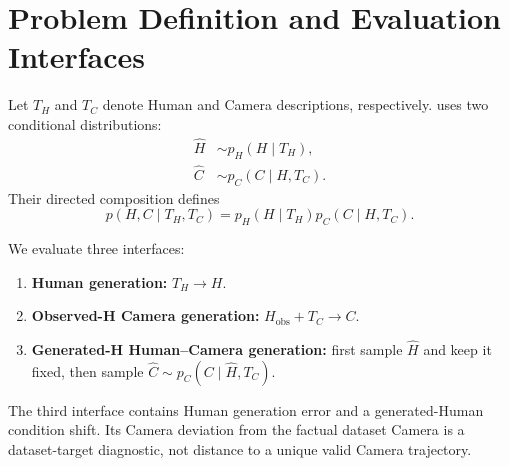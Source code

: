 \section{Problem Definition and Evaluation Interfaces}

Let $T_H$ and $T_C$ denote Human and Camera descriptions, respectively. \storymotion{} uses
two conditional distributions:
\begin{align}
  \hat H &\sim p_H(H\mid T_H), \\
  \hat C &\sim p_C(C\mid H,T_C).
\end{align}
Their directed composition defines
\begin{equation}
  p(H,C\mid T_H,T_C)=p_H(H\mid T_H)p_C(C\mid H,T_C).
\end{equation}

We evaluate three interfaces:
\begin{enumerate}
  \item \textbf{Human generation:} $T_H\rightarrow H$.
  \item \textbf{Observed-H Camera generation:} $H_{\mathrm{obs}}+T_C\rightarrow C$.
  \item \textbf{Generated-H Human--Camera generation:} first sample $\hat H$ and keep it fixed,
  then sample $\hat C\sim p_C(C\mid\hat H,T_C)$.
\end{enumerate}

The third interface contains Human generation error and a generated-Human condition shift. Its
Camera deviation from the factual dataset Camera is a dataset-target diagnostic, not distance
to a unique valid Camera trajectory.
